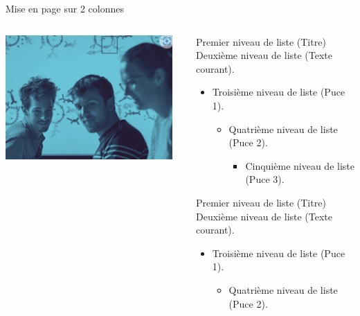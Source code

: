 \documentclass[A4,svgnames,9pt,aspectratio=169]{beamer}
\begin{document}
\begin{frame}{Mise en page sur 2 colonnes}
  \begin{columns}
      
      \begin{column}[t]{0.45\textwidth}
          \begin{center}
          \includegraphics[width=0.95\textwidth]{imgs/photo.png}      
          \end{center}
      \end{column}
        
    \begin{column}[t]{0.45\textwidth}

           \begin{block}{Premier niveau de liste (Titre)}
           Deuxième niveau de liste (Texte courant).
             \begin{itemize}
               \item Troisième niveau de liste (Puce 1).
                   \begin{itemize}
                     \item Quatrième niveau de liste (Puce 2).
                        \begin{itemize}
                           \item Cinquième niveau de liste (Puce 3).
                        \end{itemize}
                   \end{itemize}
             \end{itemize}
           \end{block}

           \begin{block}{Premier niveau de liste (Titre)}
           Deuxième niveau de liste (Texte courant).
             \begin{itemize}
               \item Troisième niveau de liste (Puce 1).
                   \begin{itemize}
                     \item Quatrième niveau de liste (Puce 2).
                   \end{itemize}
             \end{itemize}
           \end{block}


\end{column}
\end{columns}
\end{frame}
\end{document}

